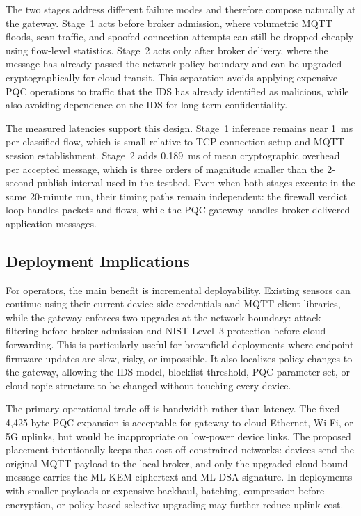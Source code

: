 \documentclass[conference]{IEEEtran}
\begin{document}
The two stages address different failure modes and therefore compose naturally at the gateway. Stage~1 acts before broker admission, where volumetric MQTT floods, scan traffic, and spoofed connection attempts can still be dropped cheaply using flow-level statistics. Stage~2 acts only after broker delivery, where the message has already passed the network-policy boundary and can be upgraded cryptographically for cloud transit. This separation avoids applying expensive PQC operations to traffic that the IDS has already identified as malicious, while also avoiding dependence on the IDS for long-term confidentiality.

The measured latencies support this design. Stage~1 inference remains near 1~ms per classified flow, which is small relative to TCP connection setup and MQTT session establishment. Stage~2 adds 0.189~ms of mean cryptographic overhead per accepted message, which is three orders of magnitude smaller than the 2-second publish interval used in the testbed. Even when both stages execute in the same 20-minute run, their timing paths remain independent: the firewall verdict loop handles packets and flows, while the PQC gateway handles broker-delivered application messages.

\subsection{Deployment Implications}

For operators, the main benefit is incremental deployability. Existing sensors can continue using their current device-side credentials and MQTT client libraries, while the gateway enforces two upgrades at the network boundary: attack filtering before broker admission and NIST Level~3 protection before cloud forwarding. This is particularly useful for brownfield deployments where endpoint firmware updates are slow, risky, or impossible. It also localizes policy changes to the gateway, allowing the IDS model, blocklist threshold, PQC parameter set, or cloud topic structure to be changed without touching every device.

The primary operational trade-off is bandwidth rather than latency. The fixed 4,425-byte PQC expansion is acceptable for gateway-to-cloud Ethernet, Wi-Fi, or 5G uplinks, but would be inappropriate on low-power device links. The proposed placement intentionally keeps that cost off constrained networks: devices send the original MQTT payload to the local broker, and only the upgraded cloud-bound message carries the ML-KEM ciphertext and ML-DSA signature. In deployments with smaller payloads or expensive backhaul, batching, compression before encryption, or policy-based selective upgrading may further reduce uplink cost.
\end{document}
